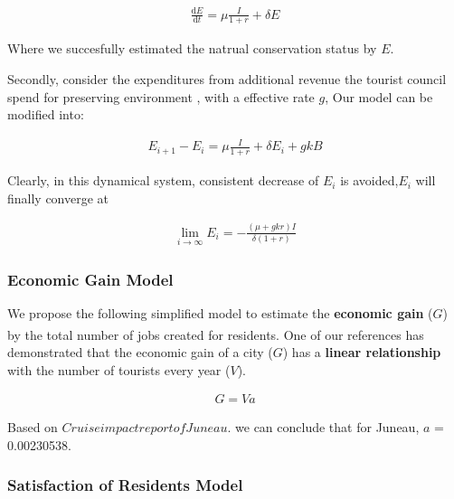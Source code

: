 \documentclass[UTF8]{mcmthesis}
\begin{document}
\begin{equation}
    \begin{aligned}
\frac{\text{d}E}{\text{d}t}  =  \mu \frac{I}{1+r}+\delta E 
    \end{aligned}
    \end{equation}

    Where we succesfully estimated the natrual conservation status by ${E}$.

Secondly, consider the expenditures from additional revenue the tourist council spend for preserving environment , with a effective rate ${g}$, Our model can be modified into:

\begin{equation}
    \begin{aligned}
{E_{i+1}} -E_{i} = \mu \frac{I}{1+r} + \delta {E_{i}} +gkB
    \end{aligned}
    \end{equation}

    Clearly, in this dynamical system, consistent decrease of {$E_i$} is avoided,{$E_i$}
   will finally converge at 

   \begin{align*}
    \lim_{i \to \infty} E_{i} = -\frac{(\mu  + gkr)I}{\delta(1+r)}
            \end{align*}


            \subsubsection{Economic Gain Model}

            \hspace*{2em} We propose the following simplified model to estimate the \textbf{economic gain} (\(G\)) by the total number of jobs created for residents. One of our references \textsuperscript{\cite{Xu}} has demonstrated that the economic gain of a city (\(G\)) has a \textbf{linear relationship} with the number of tourists every year (\(V\)).
            

    \begin{equation}
        \begin{aligned}
        G = Va
        \end{aligned}
        \end{equation}

        Based on ${Cruise impact report of Juneau}$. we can conclude that for Juneau, $a$ = 0.00230538.


        \subsubsection{Satisfaction of Residents Model}
\end{document}
